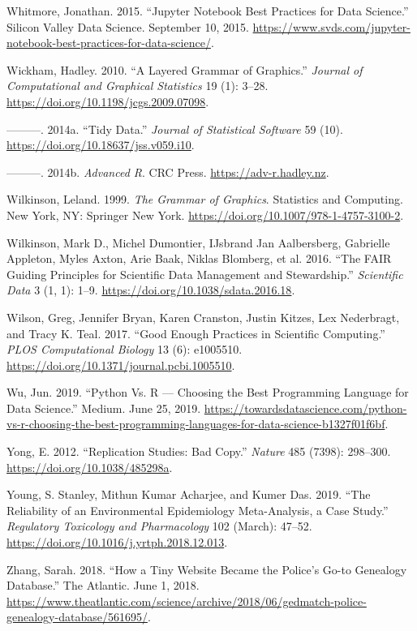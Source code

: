 \documentclass[
]{article}
\newlength{\cslhangindent}
\newenvironment{cslreferences}%
  {\setlength{\parindent}{0pt}%
  \everypar{\setlength{\hangindent}{\cslhangindent}}\ignorespaces}%
  {\par}
\begin{document}
\begin{cslreferences}
\leavevmode\hypertarget{ref-WhitmoreJupyterNotebookBest2015}{}%
Whitmore, Jonathan. 2015. ``Jupyter Notebook Best Practices for Data Science.'' Silicon Valley Data Science. September 10, 2015. \url{https://www.svds.com/jupyter-notebook-best-practices-for-data-science/}.

\leavevmode\hypertarget{ref-WickhamLayeredGrammarGraphics2010}{}%
Wickham, Hadley. 2010. ``A Layered Grammar of Graphics.'' \emph{Journal of Computational and Graphical Statistics} 19 (1): 3--28. \url{https://doi.org/10.1198/jcgs.2009.07098}.

\leavevmode\hypertarget{ref-WickhamTidyData2014}{}%
---------. 2014a. ``Tidy Data.'' \emph{Journal of Statistical Software} 59 (10). \url{https://doi.org/10.18637/jss.v059.i10}.

\leavevmode\hypertarget{ref-WickhamAdvanced2014}{}%
---------. 2014b. \emph{Advanced R}. CRC Press. \url{https://adv-r.hadley.nz}.

\leavevmode\hypertarget{ref-WilkinsonGrammarGraphics1999}{}%
Wilkinson, Leland. 1999. \emph{The Grammar of Graphics}. Statistics and Computing. New York, NY: Springer New York. \url{https://doi.org/10.1007/978-1-4757-3100-2}.

\leavevmode\hypertarget{ref-WilkinsonFAIRGuidingPrinciples2016}{}%
Wilkinson, Mark D., Michel Dumontier, IJsbrand Jan Aalbersberg, Gabrielle Appleton, Myles Axton, Arie Baak, Niklas Blomberg, et al. 2016. ``The FAIR Guiding Principles for Scientific Data Management and Stewardship.'' \emph{Scientific Data} 3 (1, 1): 1--9. \url{https://doi.org/10.1038/sdata.2016.18}.

\leavevmode\hypertarget{ref-WilsonGoodEnoughPractices2017}{}%
Wilson, Greg, Jennifer Bryan, Karen Cranston, Justin Kitzes, Lex Nederbragt, and Tracy K. Teal. 2017. ``Good Enough Practices in Scientific Computing.'' \emph{PLOS Computational Biology} 13 (6): e1005510. \url{https://doi.org/10.1371/journal.pcbi.1005510}.

\leavevmode\hypertarget{ref-WuPythonVsChoosing2019}{}%
Wu, Jun. 2019. ``Python Vs. R --- Choosing the Best Programming Language for Data Science.'' Medium. June 25, 2019. \url{https://towardsdatascience.com/python-vs-r-choosing-the-best-programming-languages-for-data-science-b1327f01f6bf}.

\leavevmode\hypertarget{ref-YongReplicationStudiesBad2012}{}%
Yong, E. 2012. ``Replication Studies: Bad Copy.'' \emph{Nature} 485 (7398): 298--300. \url{https://doi.org/10.1038/485298a}.

\leavevmode\hypertarget{ref-YoungReliabilityEnvironmentalEpidemiology2019}{}%
Young, S. Stanley, Mithun Kumar Acharjee, and Kumer Das. 2019. ``The Reliability of an Environmental Epidemiology Meta-Analysis, a Case Study.'' \emph{Regulatory Toxicology and Pharmacology} 102 (March): 47--52. \url{https://doi.org/10.1016/j.yrtph.2018.12.013}.

\leavevmode\hypertarget{ref-ZhangHowTinyWebsite2018}{}%
Zhang, Sarah. 2018. ``How a Tiny Website Became the Police's Go-to Genealogy Database.'' The Atlantic. June 1, 2018. \url{https://www.theatlantic.com/science/archive/2018/06/gedmatch-police-genealogy-database/561695/}.
\end{cslreferences}
\end{document}
